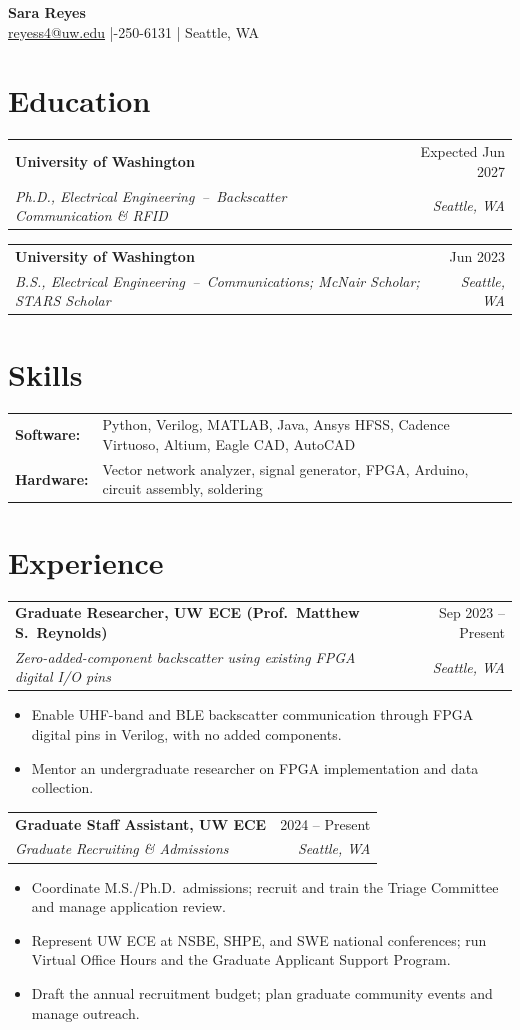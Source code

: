 \documentclass[10pt,letterpaper]{article}
\makeatletter
\newcommand{\entry}[4]{%
  \begin{tabularx}{\linewidth}{@{}X r@{}}
    \textbf{#1} & #2\\[-1pt]
    \textit{#3} & \textit{#4}
  \end{tabularx}\par}
\makeatother
\begin{document}
\begin{center}
  {\Huge\bfseries Sara Reyes}\\[3pt]
  \href{mailto:reyess4@uw.edu}{reyess4@uw.edu} \;|-250-6131 \;|\; Seattle, WA
\end{center}
\vspace{-4pt}

\section{Education}
\entry{University of Washington}{Expected Jun 2027}{Ph.D., Electrical Engineering \,--\, Backscatter Communication \& RFID}{Seattle, WA}
\entry{University of Washington}{Jun 2023}{B.S., Electrical Engineering \,--\, Communications; McNair Scholar; STARS Scholar}{Seattle, WA}

\section{Skills}
\begin{tabularx}{\linewidth}{@{}l X@{}}
  \textbf{Software:} & Python, Verilog, MATLAB, Java, Ansys HFSS, Cadence Virtuoso, Altium, Eagle CAD, AutoCAD\\
  \textbf{Hardware:} & Vector network analyzer, signal generator, FPGA, Arduino, circuit assembly, soldering\\
\end{tabularx}

\section{Experience}
\entry{Graduate Researcher, UW ECE (Prof.\ Matthew S.\ Reynolds)}{Sep 2023 -- Present}{Zero-added-component backscatter using existing FPGA digital I/O pins}{Seattle, WA}
\begin{itemize}
  \item Enable UHF-band and BLE backscatter communication through FPGA digital pins in Verilog, with no added components.
  \item Mentor an undergraduate researcher on FPGA implementation and data collection.
\end{itemize}

\entry{Graduate Staff Assistant, UW ECE}{2024 -- Present}{Graduate Recruiting \& Admissions}{Seattle, WA}
\begin{itemize}
  \item Coordinate M.S./Ph.D.\ admissions; recruit and train the Triage Committee and manage application review.
  \item Represent UW ECE at NSBE, SHPE, and SWE national conferences; run Virtual Office Hours and the Graduate Applicant Support Program.
  \item Draft the annual recruitment budget; plan graduate community events and manage outreach.
\end{itemize}
\end{document}
